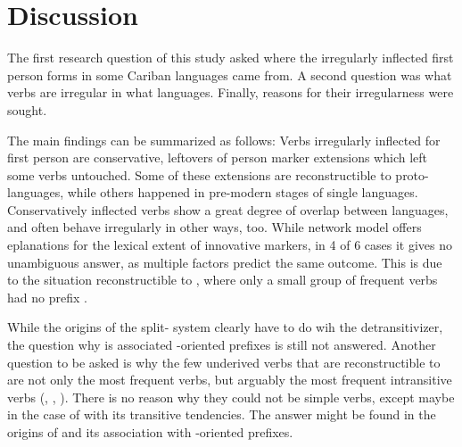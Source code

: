 \section{Discussion}
\label{sec:discussion}
The first research question of this study asked where the irregularly inflected first person forms in some Cariban languages came from.
A second question was what verbs are irregular in what languages.
Finally, reasons for their irregularness were sought.

The main findings can be summarized as follows:
Verbs irregularly inflected for first person are conservative, leftovers of person marker extensions which left some verbs untouched.
Some of these extensions are reconstructible to proto-languages, while others happened in pre-modern stages of single languages.
Conservatively inflected verbs show a great degree of overlap between languages, and often behave irregularly in other ways, too.
While  network model offers eplanations for the lexical extent of innovative markers, in 4 of 6 cases it gives no unambiguous answer, as multiple factors predict the same outcome.
This is due to the situation reconstructible to \PC, where only a small group of frequent  verbs had no prefix \detrz.

While the origins of the split- system clearly have to do wih the detransitivizer, the question why \detrz is associated -oriented prefixes \parencite{meira2000split} is still not answered.
Another question to be asked is why the few underived  verbs that are reconstructible to \PC are not only the most frequent  verbs, but arguably the most frequent intransitive verbs (, , ).
There is no reason why they could not be simple  verbs, except maybe in the case of   with its transitive tendencies.
The answer might be found in the origins of \detrz and its association with -oriented prefixes.


